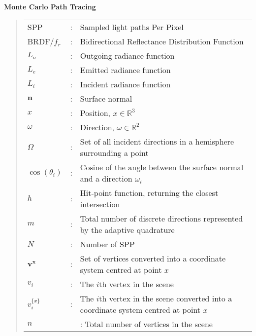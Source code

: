 \documentclass[../dissertation.tex]{subfiles}
\begin{document}
\noindent
\textbf{Monte Carlo Path Tracing}
\begin{quote}
\noindent
\begin{tabular}{lcl}

SPP &: & Sampled light paths Per Pixel\\
BRDF/$f_r$  &: & Bidirectional Reflectance Distribution Function\\
$L_o$ &: & Outgoing radiance function\\
$L_e$ &: & Emitted radiance function\\
$L_i$ &: & Incident radiance function\\
$\mathbf{n}$ &: & Surface normal\\
$x$ &: & Position, $x \in \mathbb{R}^3$\\
$\omega$ &: & Direction, $\omega \in \mathbb{R}^2$\\
$\Omega$ &: & Set of all incident directions in a hemisphere surrounding a point\\
$\cos(\theta_i)$ &: & Cosine of the angle between the surface normal and a direction $\omega_i$\\
$h$ &: & Hit-point function, returning the closest intersection\\
$m$ &: & Total number of discrete directions represented by the adaptive quadrature\\
$N$ &: & Number of SPP\\
$\mathbf{v^x}$ &: & Set of vertices converted into a coordinate system centred at point $x$\\
$v_i$ &: & The $i$th vertex in the scene\\
$v_i^{\{x\}}$ &: & The $i$th vertex in the scene converted into a coordinate system centred at point $x$\\
$n$ & &: Total number of vertices in the scene\\

\end{tabular}
\end{quote}

\pagebreak
\end{document}
